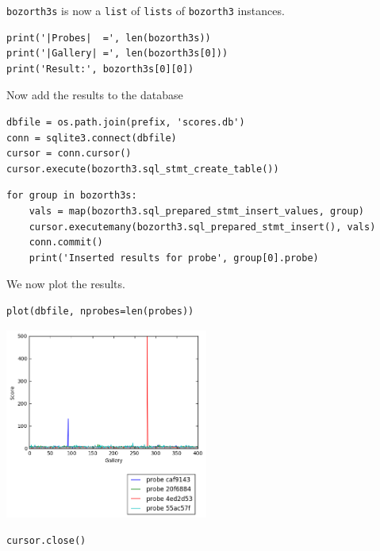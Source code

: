 \texttt{bozorth3s} is now a \texttt{list} of \texttt{lists} of
\texttt{bozorth3} instances.

\begin{lstlisting}
print('|Probes|  =', len(bozorth3s))
print('|Gallery| =', len(bozorth3s[0]))
print('Result:', bozorth3s[0][0])
\end{lstlisting}

Now add the results to the database

\begin{lstlisting}
dbfile = os.path.join(prefix, 'scores.db')
conn = sqlite3.connect(dbfile)
cursor = conn.cursor()
cursor.execute(bozorth3.sql_stmt_create_table())
\end{lstlisting}

\begin{lstlisting}
for group in bozorth3s:
    vals = map(bozorth3.sql_prepared_stmt_insert_values, group)
    cursor.executemany(bozorth3.sql_prepared_stmt_insert(), vals)
    conn.commit()
    print('Inserted results for probe', group[0].probe)
\end{lstlisting}

We now plot the results.

\begin{lstlisting}
plot(dbfile, nprobes=len(probes))
\end{lstlisting}

\includegraphics[width=0.5\textwidth]{notebooks/fingerprint/fingerprint_matching_74_0.png}

\begin{lstlisting}
cursor.close()
\end{lstlisting}
